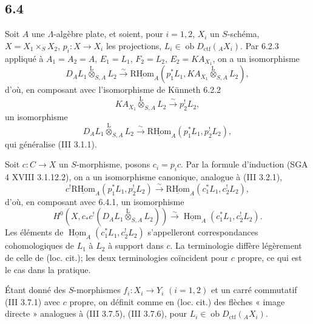 \documentclass[11pt]{article}
\DeclareMathOperator{\Hom}{Hom}
\newcommand{\R}{\mathrm{R}}\newcommand{\RHomCore}{\mathrm{RHom}}
\providecommand{\RHom}{\RHomCore}
\providecommand{\uRHom}{\underline{\RHom}}
\providecommand{\uHom}{\underline{\Hom}}
\providecommand{\lten}{\overset{\mathrm L}{\otimes}}
\providecommand{\Ob}{\operatorname{ob}}
\providecommand{\RHom}{\RHomCore}
\providecommand{\Hom}{\operatorname{Hom}}
\providecommand{\lten}{\overset{\mathrm L}{\otimes}}
\providecommand{\RHom}{\R\mathcal{H}om}
\providecommand{\lten}{\overset{\mathrm L}{\otimes}}
\providecommand{\Ob}{\operatorname{ob}}
\providecommand{\R}{\mathrm R}
\providecommand{\lten}{\overset{\mathrm L}{\otimes}}
\providecommand{\lten}{\overset{\mathrm L}{\otimes}}
\providecommand{\Ob}{\operatorname{Ob}}
\providecommand{\lten}{\overset{\mathrm L}{\otimes}}
\providecommand{\RHom}{\RHomCore}
\providecommand{\Hom}{\operatorname{Hom}}
\providecommand{\Ob}{\operatorname{ob}}
\providecommand{\Ob}{\operatorname{Ob}}
\providecommand{\lten}{\overset{\mathrm L}{\otimes}}
\begin{document}
\subsection*{6.4}
Soit $A$ une $\Lambda$-algèbre plate, et soient, pour $i=1,2$, $X_i$ un $S$-schéma, $X=X_1\times_SX_2$, $p_i:X\to X_i$ les projections, $L_i\in\Ob D_{\mathrm{ctf}}({}_AX_i)$. Par 6.2.3 appliqué à $A_1=A_2=A$, $E_1=L_1$, $F_2=L_2$, $E_2=KA_{X_1}$, on a un isomorphisme
\[
D_A L_1\lten_{S,A}L_2
\xrightarrow{\sim}
\uRHom_A(p_1^*L_1,KA_{X_1}\lten_{S,A}L_2),
\]
d'où, en composant avec l'isomorphisme de Künneth 6.2.2
\[
KA_{X_1}\lten_{S,A}L_2\xrightarrow{\sim}p_2^!L_2,
\]
un isomorphisme
\begin{equation}
D_AL_1\lten_{S,A}L_2
\xrightarrow{\sim}
\uRHom_A(p_1^*L_1,p_2^!L_2),
\tag{6.4.1}
\end{equation}
qui généralise (III 3.1.1).

Soit $c:C\to X$ un $S$-morphisme, posons $c_i=p_ic$. Par la formule d'induction (SGA 4 XVIII 3.1.12.2), on a un isomorphisme canonique, analogue à (III 3.2.1),
\begin{equation}
c^!\uRHom_A(p_1^*L_1,p_2^!L_2)
\xrightarrow{\sim}
\uRHom_A(c_1^*L_1,c_2^!L_2),
\tag{6.4.2}
\end{equation}
d'où, en composant avec 6.4.1, un isomorphisme
\begin{equation}
H^0(X,c_*c^!(D_AL_1\lten_{S,A}L_2))
\xrightarrow{\sim}
\uHom_A(c_1^*L_1,c_2^!L_2).
\tag{6.4.3}
\end{equation}
Les éléments de $\uHom_A(c_1^*L_1,c_2^!L_2)$ s'appelleront correspondances cohomologiques de $L_1$ à $L_2$ à support dans $c$. La terminologie diffère légèrement de celle de (loc. cit.); les deux terminologies coïncident pour $c$ propre, ce qui est le cas dans la pratique.

Étant donné des $S$-morphismes $f_i:X_i\to Y_i$ $(i=1,2)$ et un carré commutatif (III 3.7.1) avec $c$ propre, on définit comme en (loc. cit.) des flèches « image directe » analogues à (III 3.7.5), (III 3.7.6), pour $L_i\in\Ob D_{\mathrm{ctf}}({}_AX_i)$.
\end{document}
